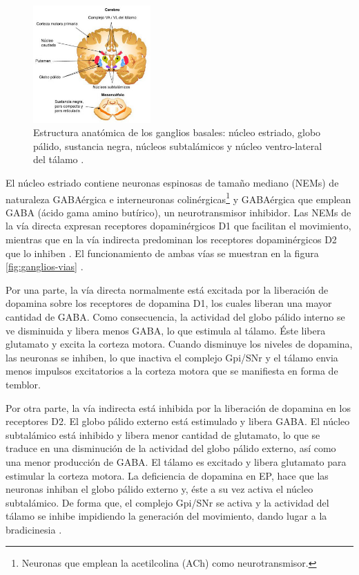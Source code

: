  
\begin{figure}[ht]
    \centering
    \includegraphics[width=0.4\textwidth]{img/ganglios-basales.jpg}
    \caption{Estructura anatómica de los ganglios basales: núcleo estriado, globo pálido, sustancia negra, núcleos subtalámicos y núcleo ventro-lateral del tálamo \cite{website:Síndesi}.}
    \label{fig:ganglios-basales}
\end{figure}

El núcleo estriado contiene neuronas espinosas de tamaño mediano (NEMs) de naturaleza GABAérgica e interneuronas colinérgicas\footnote{Neuronas que emplean la acetilcolina (ACh) como neurotransmisor.} y GABAérgica que emplean GABA (ácido gama amino butírico), un neurotransmisor inhibidor. Las NEMs de la vía directa expresan receptores dopaminérgicos D1 que facilitan el movimiento, mientras que en la vía indirecta predominan los receptores dopaminérgicos D2 que lo inhiben \cite{avila2014ganglios}. El funcionamiento de ambas vías se muestran en la figura \ref{fig:ganglios-vias} .

Por una parte, la vía directa normalmente está excitada por la liberación de dopamina sobre los receptores de dopamina D1, los cuales liberan una mayor cantidad de GABA. Como consecuencia, la actividad del globo pálido interno se ve disminuida y libera menos GABA, lo que estimula al tálamo. Éste libera glutamato y excita la corteza motora.  Cuando disminuye los niveles de dopamina, las neuronas se inhiben, lo que inactiva el complejo Gpi/SNr y el tálamo envia menos impulsos excitatorios a la corteza motora que se manifiesta en forma de temblor.

Por otra parte, la vía indirecta está inhibida por la liberación de dopamina en los receptores D2. El globo pálido externo está estimulado y libera GABA. El núcleo subtalámico está inhibido y libera menor cantidad de glutamato, lo que se traduce en una disminución de la actividad del globo pálido externo, así como una menor producción de GABA. El tálamo es excitado y libera glutamato para estimular la corteza  motora. La deficiencia de dopamina en EP, hace que las neuronas inhiban el globo pálido externo y, éste a su vez activa el núcleo subtalámico. De forma que, el complejo Gpi/SNr se activa y la actividad del tálamo se inhibe impidiendo la generación del movimiento, dando lugar a la bradicinesia \cite{marin2018enfermedad}.

